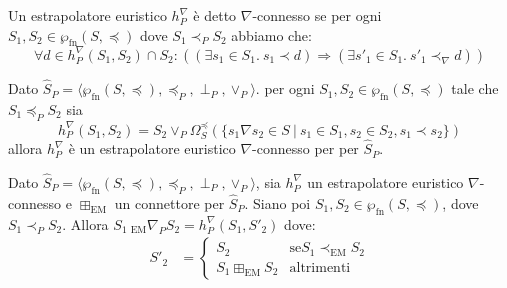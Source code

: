 \begin{definition}\label{def:estrapolatoreEuristicoWideningConnesso}
Un estrapolatore euristico \(h_{P}^{\nabla}\)
è detto \(\nabla\)-connesso se per ogni \(S_1, S_2\in\wp_{\textrm{fn}}(S, \preceq)\) dove \(S_1\prec_P S_2\) abbiamo che:
\[\forall d \in h_{P}^{\nabla}(S_1, S_2)\cap S_2:((\exists s_1\in S_1.\ s_1\prec d)\Rightarrow (\exists s'_1\in S_1.\ s'_1 \prec_{\nabla} d))\]
\end{definition}

\begin{proposition}\label{prop:estrapolatoreEuristicoWideningConnesso}
Dato \(\hat{S}_P = \langle \wp_{\textrm{fn}}(S, \preceq),\preceq_P, \perp_P ,\vee_P\rangle\). per ogni \(S_1, S_2\in\wp_{\textrm{fn}}(S, \preceq)\) tale che \(S_1\preceq_P S_2\) sia
\[h_{P}^{\nabla}(S_1, S_2) = S_2\vee_P\Omega_{S}^{\preceq}(\lbrace s_1\nabla s_2 \in S\ \vert\ s_1\in S_1, s_2\in S_2, s_1\prec s_2 \rbrace)\]
allora \(h_{P}^{\nabla}\) è un estrapolatore euristico \(\nabla\)-connesso per per \(\hat{S}_P\).
\end{proposition}

\begin{definition}\label{def:wideningPowersetDomain}
Dato \(\hat{S}_P = \langle \wp_{\textrm{fn}}(S, \preceq),\preceq_P, \perp_P ,\vee_P\rangle\), sia \(h_{P}^{\nabla}\) un estrapolatore euristico \(\nabla\)-connesso e \(\boxplus_{\textrm{EM}}\) un connettore per \(\hat{S}_P\). Siano poi \(S_1, S_2\in\wp_{\textrm{fn}}(S, \preceq)\), dove \(S_1\prec_P S_2\). Allora \(S_1\ _{\textrm{EM}}\nabla_P S_2 = h_{P}^{\nabla}(S_1, S'_2)\) dove:
	\begin{align*}
	S'_2 &=  \begin{cases}
				S_2 &\textrm{se} S_1\prec_{\textrm{EM}} S_2 \\
				S_1\boxplus_{\textrm{EM}} S_2 &\textrm{altrimenti}
				\end{cases}
	\end{align*}
\end{definition}
